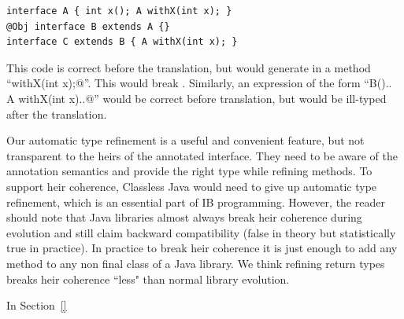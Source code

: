 \begin{lstlisting}
interface A { int x(); A withX(int x); }
@Obj interface B extends A {}
interface C extends B { A withX(int x); }
\end{lstlisting}

\noindent This code is correct before the translation, but \mixin would  generate in \Q@B@  a method ``\Q@B withX(int x);@''.
This would break \Q@C@.
Similarly, an expression of the form ``\Q@new B(){.. A withX(int x){..}}@''
would be correct before translation, but would be ill-typed after the translation.

Our automatic type refinement is a useful and convenient feature, but
not transparent to the heirs of the annotated interface.  They need to
be aware of the annotation semantics and provide the right type while
refining methods. To support heir coherence, Classless Java would need
to give up automatic type refinement, which is an essential part of IB programming.
However, the reader should note that Java libraries almost always break heir
coherence during evolution and still claim backward compatibility (false in
theory but statistically true in practice). In practice to break heir
coherence it is just enough to add any method to any
non final class of a Java library.  We think refining return
types breaks heir coherence ``less" than normal library evolution.

In Section~\ref{} 

